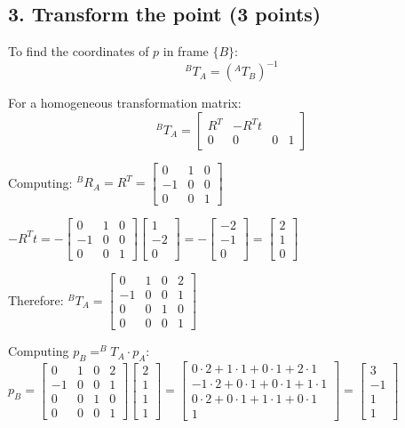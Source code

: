 \documentclass[11pt]{article}
\begin{document}
\subsection*{3. Transform the point (3 points)}
To find the coordinates of $p$ in frame $\{B\}$:
$$^B T_A = (^A T_B)^{-1}$$

For a homogeneous transformation matrix:
$$^B T_A = \begin{bmatrix}
R^T & -R^T t \\
0 & 0 & 0 & 1
\end{bmatrix}$$

Computing:
$^B R_A = R^T = \begin{bmatrix}
0 & 1 & 0 \\
-1 & 0 & 0 \\
0 & 0 & 1
\end{bmatrix}$

$-R^T t = -\begin{bmatrix}
0 & 1 & 0 \\
-1 & 0 & 0 \\
0 & 0 & 1
\end{bmatrix} \begin{bmatrix} 1 \\ -2 \\ 0 \end{bmatrix} = -\begin{bmatrix} -2 \\ -1 \\ 0 \end{bmatrix} = \begin{bmatrix} 2 \\ 1 \\ 0 \end{bmatrix}$

Therefore:
$^B T_A = \begin{bmatrix}
0 & 1 & 0 & 2 \\
-1 & 0 & 0 & 1 \\
0 & 0 & 1 & 0 \\
0 & 0 & 0 & 1
\end{bmatrix}$

Computing $p_B = ^B T_A \cdot p_A$:
$p_B = \begin{bmatrix}
0 & 1 & 0 & 2 \\
-1 & 0 & 0 & 1 \\
0 & 0 & 1 & 0 \\
0 & 0 & 0 & 1
\end{bmatrix} \begin{bmatrix} 2 \\ 1 \\ 1 \\ 1 \end{bmatrix} = \begin{bmatrix} 0\cdot2 + 1\cdot1 + 0\cdot1 + 2\cdot1 \\ -1\cdot2 + 0\cdot1 + 0\cdot1 + 1\cdot1 \\ 0\cdot2 + 0\cdot1 + 1\cdot1 + 0\cdot1 \\ 1 \end{bmatrix} = \begin{bmatrix} 3 \\ -1 \\ 1 \\ 1 \end{bmatrix}$
\end{document}
